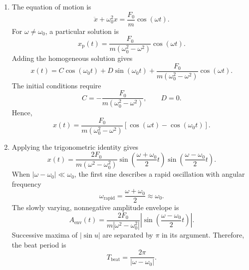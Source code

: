 \documentclass[12pt]{article}
\begin{document}
\begin{enumerate}
    \item[(a)] The equation of motion is
    \begin{equation}
        \ddot{x}+\omega_0^2x=\frac{F_0}{m}\cos(\omega t).
    \end{equation}
    For $\omega\neq\omega_0$, a particular solution is
    \begin{equation}
        x_{\mathrm p}(t)
        =\frac{F_0}{m(\omega_0^2-\omega^2)}\cos(\omega t).
    \end{equation}
    Adding the homogeneous solution gives
    \begin{equation}
        x(t)=C\cos(\omega_0t)+D\sin(\omega_0t)
        +\frac{F_0}{m(\omega_0^2-\omega^2)}\cos(\omega t).
    \end{equation}
    The initial conditions require
    \begin{equation}
        C=-\frac{F_0}{m(\omega_0^2-\omega^2)},
        \qquad D=0.
    \end{equation}
    Hence,
    \begin{equation}
        \boxed{
        x(t)=\frac{F_0}{m(\omega_0^2-\omega^2)}
        \left[\cos(\omega t)-\cos(\omega_0t)\right].
        }
    \end{equation}

    \item[(b)] Applying the trigonometric identity gives
    \begin{equation}
        x(t)=\frac{2F_0}{m(\omega^2-\omega_0^2)}
        \sin\left(\frac{\omega+\omega_0}{2}t\right)
        \sin\left(\frac{\omega-\omega_0}{2}t\right).
    \end{equation}
    When $|\omega-\omega_0|\ll\omega_0$, the first sine describes
    a rapid oscillation with angular frequency
    \begin{equation}
        \omega_{\mathrm{rapid}}
        =\frac{\omega+\omega_0}{2}\approx\omega_0.
    \end{equation}
    The slowly varying, nonnegative amplitude envelope is
    \begin{equation}
        A_{\mathrm{env}}(t)
        =\frac{2F_0}{m|\omega^2-\omega_0^2|}
        \left|
        \sin\left(\frac{\omega-\omega_0}{2}t\right)
        \right|.
    \end{equation}
    Successive maxima of $|\sin u|$ are separated by $\pi$ in its
    argument. Therefore, the beat period is
    \begin{equation}
        \boxed{
        T_{\mathrm{beat}}=\frac{2\pi}{|\omega-\omega_0|}.
        }
    \end{equation}


\end{enumerate}
\end{document}
